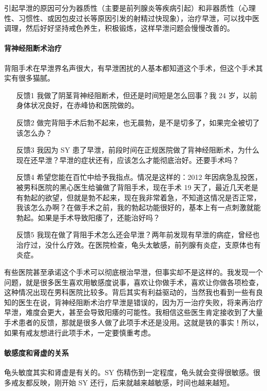 \documentclass[fontset=founder]{ctexart}
\begin{document}
引起早泄的原因可分为器质性（主要是前列腺炎等疾病引起）和非器质性（心理性、习惯性、或因包皮过长等原因引发的射精过快现象），治疗早泄，可以找中医调理，然后好好坚持戒色养生，积极锻炼，这样早泄问题会慢慢改善的。

\paragraph{背神经阻断术治疗}

背阻手术在早泄界名声很大，有早泄困扰的人基本都知道这个手术，但这个手术其实有很多猫腻。

\begin{enumerate}
    \item[反馈1] 我做了阴茎背神经阻断术，但还是时间短是怎么回事？我 24 岁，以前身体状况良好，在赤峰协和医院做的。
    \item[反馈2] 做完背阻手术后勃不起来，也无晨勃，是不是切多了，如果完全被切了该怎么办？
    \item[反馈3] 我因为 SY 患了早泄，前段时间在正规医院做了背神经阻断术，为什么现在还早泄？早泄的症状还有，应该怎么才能彻底治好。还要手术吗？
    \item[反馈4] 希望您能在百忙中给予我指点。情况是这样的：2012 年因病急乱投医，被男科医院的黑心医生给骗做了背阻手术，现在手术 19 天了，最近几天老是有勃起的欲望，但就是勃不起来，现在我非常着急，不知道这情况是否正常，我该怎么办啊？在做手术之前，我的勃起功能很好的，基本上有一点刺激就能勃起。如果是手术导致阳痿了，还能治好吗？
    \item[反馈5] 我现在做了背阻手术怎么还会早泄？两年前发现有早泄的病症，曾经也治疗过，没什么疗效。在医院检查，龟头太敏感，前列腺有炎症，支原体也有炎症。
\end{enumerate}

有些医院甚至承诺这个手术可以彻底根治早泄，但事实却不是这样的。我发现一个问题，就是很多医生喜欢用敏感度说事，喜欢让你做手术，喜欢让你做各项检查，这种情况出现在男科医院比较多。背后其实有利益驱动的，当然我也看到一些有良知的医生在说，背神经阻断术治疗早泄是错误的，因为万一治疗失败，将来再治疗早泄，难度会更大，甚至会导致阳痿的可能性。我相信这些医生肯定接收到了大量手术患者的反馈，那就是很多人做了此项手术还是没用。这就是铁的事实！所以，如果有戒友想进行此项手术，一定要慎重考虑。

\paragraph{敏感度和肾虚的关系}

龟头敏度其实和肾虚是有关的。SY 伤精伤到一定程度，龟头就会变得很敏感。很多戒友都反映，刚开始 SY 还行，后来就越来越敏感，时间也越来越短。
\end{document}

